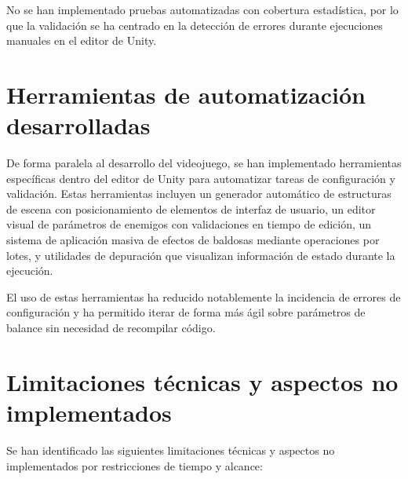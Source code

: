 No se han implementado pruebas automatizadas con cobertura estadística, por lo que la validación se ha centrado en la detección de errores durante ejecuciones manuales en el editor de Unity.

\section{Herramientas de automatización desarrolladas}

De forma paralela al desarrollo del videojuego, se han implementado herramientas específicas dentro del editor de Unity para automatizar tareas de configuración y validación. Estas herramientas incluyen un generador automático de estructuras de escena con posicionamiento de elementos de interfaz de usuario, un editor visual de parámetros de enemigos con validaciones en tiempo de edición, un sistema de aplicación masiva de efectos de baldosas mediante operaciones por lotes, y utilidades de depuración que visualizan información de estado durante la ejecución.

El uso de estas herramientas ha reducido notablemente la incidencia de errores de configuración y ha permitido iterar de forma más ágil sobre parámetros de balance sin necesidad de recompilar código.

\section{Limitaciones técnicas y aspectos no implementados}

Se han identificado las siguientes limitaciones técnicas y aspectos no implementados por restricciones de tiempo y alcance:

